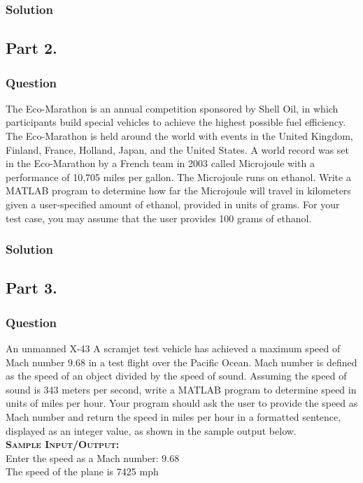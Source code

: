 \documentclass[a4paper, 10pt]{article}
\begin{document}
			\subsubsection{Solution}	
				
				\pagebreak
		\subsection{Part 2.}
			\subsubsection{Question}
				\noindent The Eco-Marathon is an annual competition sponsored by Shell Oil, in which participants build special vehicles to achieve the highest possible 
				fuel efficiency. The Eco-Marathon is held around the world with events in the United Kingdom, Finland, France, Holland, Japan,
				and the United States. A world record was set in the Eco-Marathon by a French team in 2003 called Microjoule with a performance of 10,705 
				miles per gallon. The Microjoule runs on ethanol. Write a MATLAB program to determine how far the Microjoule will travel in kilometers given a 
				user-specified amount of ethanol, provided in units of grams. For your test case, you may assume that the user provides 100 grams of ethanol.
			\subsubsection{Solution}
				
		\subsection{Part 3.}
			\subsubsection{Question}
				\noindent An unmanned X-43 A scramjet test vehicle has achieved a maximum speed of Mach number 9.68 in a test flight over the Pacific Ocean. Mach 
				number is defined as the speed of an object divided by the speed of sound. Assuming the speed of sound is 343 meters per
				second, write a MATLAB program to determine speed in units of miles per hour. Your program should ask the user to provide the speed as Mach 
				number and return the speed in miles per hour in a formatted sentence, displayed as an integer value, as shown in the sample
				output below. \\
				\hspace{5mm} \textbf{\textsc{Sample Input/Output:}} \\
				\hspace{5mm} Enter the speed as a Mach number: 9.68 \\
				\hspace{5mm} The speed of the plane is 7425 mph
\end{document}
